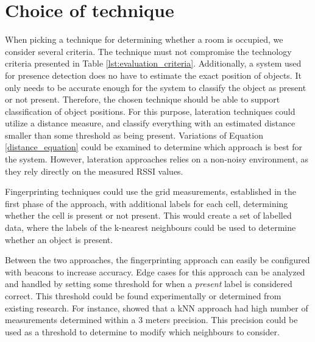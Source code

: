 \section{Choice of technique}
When picking a technique for determining whether a room is occupied, we consider several criteria.
The technique must not compromise the technology criteria presented in Table \ref{lst:evaluation_criteria}.
Additionally, a system used for presence detection does no have to estimate the exact position of objects.
It only needs to be accurate enough for the system to classify the object as present or not present.
Therefore, the chosen technique should be able to support classification of object positions.  
For this purpose, lateration techniques could utilize a distance measure, and classify everything with an estimated distance smaller than some threshold as being present.
Variations of Equation \ref{distance_equation} could be examined to determine which approach is best for the system.
However, lateration approaches relies on a non-noisy environment, as they rely directly on the measured RSSI values.

Fingerprinting techniques could use the grid measurements, established in the first phase of the approach, with additional labels for each cell, determining whether the cell is present or not present.
This would create a set of labelled data, where the labels of the k-nearest neighbours could be used to determine whether an object is present. 

Between the two approaches, the fingerprinting approach can easily be configured with beacons to increase accuracy.
Edge cases for this approach can be analyzed and handled by setting some threshold for when a \textit{present} label is considered correct. 
This threshold could be found experimentally or determined from existing research. 
For instance, \citeauthor{ble_kneares_neural}\cite{ble_kneares_neural} showed that a kNN approach had high number of measurements determined within a 3 meters precision. 
This precision could be used as a threshold to determine to modify which neighbours to consider.    
